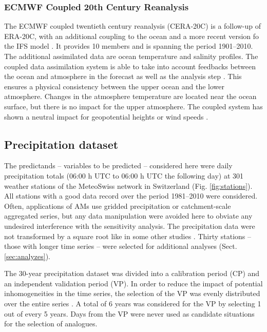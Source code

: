 \documentclass{ametsoc}
\begin{document}
\subsubsection{ECMWF Coupled 20th Century Reanalysis}

The ECMWF coupled twentieth century reanalysis (CERA-20C) is a follow-up of ERA-20C, with an additional coupling to the ocean and a more recent version fo the IFS model \citep{Laloyaux2017}. It provides 10 members and is spanning the period 1901--2010. The additional assimilated data are ocean temperature and salinity profiles. The coupled data assimilation system is able to take into account feedbacks between the ocean and atmosphere in the forecast as well as the analysis step \citep{Laloyaux2016}. This ensures a physical consistency between the upper ocean and the lower atmosphere. Changes in the atmosphere temperature are located near the ocean surface, but there is no impact for the upper atmosphere. The coupled system has shown a neutral impact for geopotential heights or wind speeds \citep{Laloyaux2016}.



\subsection{Precipitation dataset}
\label{sec:precip}

The predictands -- variables to be predicted -- considered here were daily precipitation totals (06:00 h UTC to 06:00 h UTC the following day) at 301 weather stations of the MeteoSwiss network in Switzerland (Fig. \ref{fig:stations}). All stations with a good data record over the period 1981--2010 were considered. Often, applications of AMs use gridded precipitation or catchment-scale aggregated series, but any data manipulation were avoided here to obviate any undesired interference with the sensitivity analysis. The precipitation data were not transformed by a square root like in some other studies \cite[see e.g.][]{Bontron2004}. Thirty stations -- those with longer time series -- were selected for additional analyses (Sect. \ref{sec:analyzes}).

The 30-year precipitation dataset was divided into a calibration period (CP) and an independent validation period (VP). In order to reduce the impact of potential inhomogeneities in the time series, the selection of the VP was evenly distributed over the entire series \citep[as in][]{BenDaoud2010}. A total of 6 years was considered for the VP by selecting 1 out of every 5 years. Days from the VP were never used as candidate situations for the selection of analogues.
\end{document}
